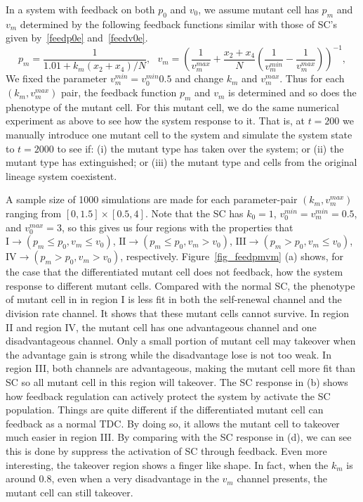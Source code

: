 \documentclass[12pt]{article}
\begin{document}
In a system with feedback on both $p_0$ and $v_0$, 
we assume mutant cell has $p_m$ and $v_m$ determined
by the following feedback functions similar 
with those of SC's given by~\eqref{feedp0e} and~\eqref{feedv0e}.
$$
p_m = \frac{1}{1.01+k_m (x_2 + x_4)/N}, \ \ \ 
v_m = \left( \frac{1}{v_m^{max}} + \frac{x_2+x_4}{N}
\left( \frac{1}{v_m^{min}} - \frac{1}{v_m^{max}}\right) \right)^{-1}, 
$$
We fixed the parameter $v_m^{min}=v_0^{min}0.5$ and change 
$k_m$ and $v_m^{max}$. Thus for each $(k_m, v_m^{max})$ 
pair, the feedback function $p_m$ and $v_m$ is determined
and so does the phenotype of the mutant cell. For 
this mutant cell, we do the same numerical experiment as above to
see how the system response to it. That is, at $t=200$
we manually introduce one mutant cell to the system and 
simulate the system state to $t=2000$ to see if: (i) 
the mutant type has taken over the system; or (ii) 
the mutant type has extinguished; or (iii) the mutant 
type and cells from the original lineage system coexistent.

A sample size of 1000 simulations are made for each parameter-pair
$(k_m, v_m^{max})$ ranging from $[0, 1.5]\times[0.5, 4]$.
Note that the SC has $k_0 = 1$, $v_0^{min}=v_m^{min}=0.5$,
and $v_0^{max}=3$, so this gives us four regions with the 
properties that $\mathrm{I} \rightarrow (p_m \le p_0, v_m \le v_0)$, 
$\mathrm{II} \rightarrow (p_m \le p_0, v_m > v_0)$, 
$\mathrm{III} \rightarrow (p_m > p_0, v_m \le v_0)$, 
$\mathrm{IV} \rightarrow (p_m > p_0, v_m > v_0)$, 
respectively. Figure~\ref{fig_feedpmvm} (a) shows,
for the case that the differentiated mutant cell does not 
feedback, how the system response to different mutant cells.
Compared with the normal SC, 
the phenotype of mutant cell in in region I
is less fit in both the self-renewal channel and 
the division rate channel.
It shows that these mutant cells cannot survive.
In region II and region IV, the mutant cell has 
one advantageous channel and one disadvantageous channel.
Only a small portion of mutant cell may takeover when 
the advantage gain is strong while the 
disadvantage lose is not too weak.
In region III, both channels are advantageous, making 
the mutant cell more fit than SC so all mutant cell in 
this region will takeover. The SC response in (b) shows
how feedback regulation can actively protect the system
by activate the SC population. Things are quite different
if the differentiated mutant cell can feedback as a normal
TDC. By doing so, it allows the mutant cell to takeover 
much easier in region III. By comparing with the SC response
in (d), we can see this is done by suppress the activation of
SC through feedback. Even more interesting, 
the takeover region shows a finger like shape.
In fact, when the $k_m$ is around 0.8, even when a
very disadvantage in the $v_m$ channel presents, the 
mutant cell can still takeover. 
\end{document}

